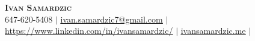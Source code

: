 \begin{center}
	\textbf{\Huge \scshape Ivan Samardzic} \\ \vspace{1pt}
	\small 647-620-5408 $|$
    \href{mailto:ivan.samardzic7@gmail.com}{\underline{ivan.samardzic7@gmail.com}} $|$
	\href{https://www.linkedin.com/in/ivansamardzic/}{\underline{https://www.linkedin.com/in/ivansamardzic/}} $|$
	\href{https://ivansamardzic.me}{\underline{ivansamardzic.me}} $|$

\end{center}
